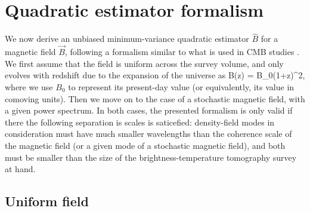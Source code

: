 \section{Quadratic estimator formalism}
\label{sec:estimators}

We now derive an unbiased minimum-variance quadratic estimator $\widehat B$ for a magnetic field $\vec B$, following a formalism similar to what is used in CMB studies \cite{}. We first assume that the field is uniform across the survey volume, and only evolves with redshift due to the expansion of the universe as 
\beq
B(z) = B_0(1+z)^2,
\label{eq:B0}
\eeq
where we use $B_0$ to represent its present-day value (or equivalently, its value in comoving units). Then we move on to the case of a stochastic magnetic field, with a given power spectrum. In both cases, the presented formalism is only valid if there the following separation is scales is saticefied: density-field modes in consideration must have much smaller wavelengths than the coherence scale of the magnetic field (or a given mode of a stochastic magnetic field), and both must be smaller than the size of the brightness-temperature tomography survey at hand.

\subsection{Uniform field}
\label{subsec:uniform}

